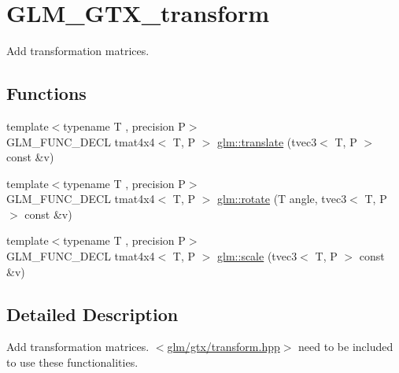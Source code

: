\hypertarget{group__gtx__transform}{\section{G\-L\-M\-\_\-\-G\-T\-X\-\_\-transform}
\label{group__gtx__transform}
}


Add transformation matrices.  


\subsection*{Functions}
\begin{DoxyCompactItemize}
\item 
{\footnotesize template$<$typename T , precision P$>$ }\\G\-L\-M\-\_\-\-F\-U\-N\-C\-\_\-\-D\-E\-C\-L tmat4x4$<$ T, P $>$ \hyperlink{group__gtx__transform_ga838c4505ef7f254ed05117b1ac9691fb}{glm\-::translate} (tvec3$<$ T, P $>$ const \&v)
\item 
{\footnotesize template$<$typename T , precision P$>$ }\\G\-L\-M\-\_\-\-F\-U\-N\-C\-\_\-\-D\-E\-C\-L tmat4x4$<$ T, P $>$ \hyperlink{group__gtx__transform_ga2020c91bf61e050882b3a5c18eada700}{glm\-::rotate} (T angle, tvec3$<$ T, P $>$ const \&v)
\item 
{\footnotesize template$<$typename T , precision P$>$ }\\G\-L\-M\-\_\-\-F\-U\-N\-C\-\_\-\-D\-E\-C\-L tmat4x4$<$ T, P $>$ \hyperlink{group__gtx__transform_ga1972d4a66a2e92637c8aaee598417a71}{glm\-::scale} (tvec3$<$ T, P $>$ const \&v)
\end{DoxyCompactItemize}


\subsection{Detailed Description}
Add transformation matrices. $<$\hyperlink{transform_8hpp}{glm/gtx/transform.\-hpp}$>$ need to be included to use these functionalities. 

